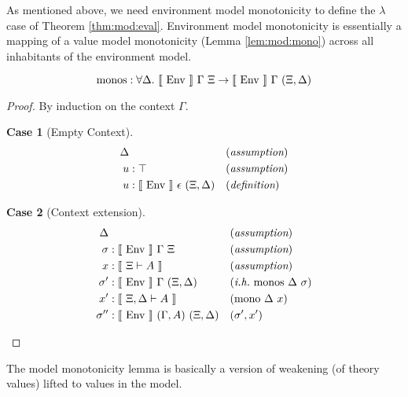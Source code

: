 \documentclass{llncs}
\newtheorem{lcase}{Case}
\newcommand{\refthm}[1]{Theorem \ref{thm:#1}}
\newcommand{\reflem}[1]{Lemma \ref{lem:#1}}
\def\marr{\rightarrow}
\def\lam{\lambda}
\def\emp{\epsilon}
\def\mono{\fun{mono}}
\def\monos{\fun{monos}}
\def\bydef{(\textit{definition})}
\def\byass{(\textit{assumption})}
\newcommand{\ih}[1]{(\textit{i.h.}~ #1)}
\newcommand{\by}[1]{(#1)}
\newcommand{\all}[1]{\forall#1.~}
\newcommand{\el}[1]{\llbracket ~ #1 ~ \rrbracket}
\newcommand{\fun}[1]{\textmd{#1}}
\newcommand{\xtypm}[1]{\el{\Xi \vdash #1}}
\newcommand{\xdtypm}[1]{\el{\Xi, \Delta \vdash #1}}
\newcommand{\gmenv}[1]{\el{\fun{Env}}~\Gamma~#1}
\newcommand{\cmenv}[2]{\el{\fun{Env}}~#1~#2}
\begin{document}
As mentioned above, we need environment model monotonicity
to define the $\lam$ case of \refthm{mod:eval}. Environment model
monotonicity is essentially a mapping of a value model
monotonicity (\reflem{mod:mono}) across all inhabitants of the
environment model.

\begin{lemma}
\label{lem:mod:monos}
$$
\monos : \all{\Delta} \gmenv{\Xi} \marr \gmenv{(\Xi, \Delta)}
$$

\begin{proof}
By induction on the context $\Gamma$.

\begin{lcase}[Empty Context]
\begin{align*}
\Delta& && \byass\\
u &: \top && \byass\\
u &: \cmenv{\emp}{(\Xi, \Delta)} && \bydef
\end{align*}
\end{lcase}

\begin{lcase}[Context extension]
\begin{align*}
\Delta& && \byass\\
\sigma &: \gmenv{\Xi} && \byass\\
x    &: \xtypm{A} && \byass\\
\sigma'  &: \gmenv{(\Xi, \Delta)} && \ih{\monos~\Delta~\sigma}\\
x'   &: \xdtypm{A} && \by{\mono~\Delta~x}\\
\sigma'' &: \cmenv{(\Gamma, A)}{(\Xi, \Delta)} && \by{\sigma', x'}
\end{align*}
\end{lcase}

\end{proof}

\end{lemma}

The model monotonicity lemma is basically a version of weakening (of
theory values) lifted to values in the model. 
\end{document}
